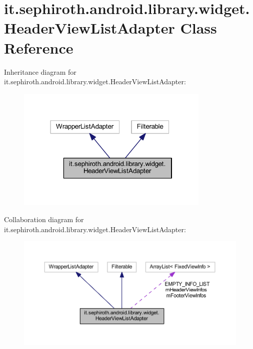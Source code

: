 \hypertarget{classit_1_1sephiroth_1_1android_1_1library_1_1widget_1_1_header_view_list_adapter}{}\section{it.\+sephiroth.\+android.\+library.\+widget.\+Header\+View\+List\+Adapter Class Reference}
\label{classit_1_1sephiroth_1_1android_1_1library_1_1widget_1_1_header_view_list_adapter}


Inheritance diagram for it.\+sephiroth.\+android.\+library.\+widget.\+Header\+View\+List\+Adapter\+:
\nopagebreak
\begin{figure}[H]
\begin{center}
\leavevmode
\includegraphics[width=262pt]{classit_1_1sephiroth_1_1android_1_1library_1_1widget_1_1_header_view_list_adapter__inherit__graph}
\end{center}
\end{figure}


Collaboration diagram for it.\+sephiroth.\+android.\+library.\+widget.\+Header\+View\+List\+Adapter\+:
\nopagebreak
\begin{figure}[H]
\begin{center}
\leavevmode
\includegraphics[width=350pt]{classit_1_1sephiroth_1_1android_1_1library_1_1widget_1_1_header_view_list_adapter__coll__graph}
\end{center}
\end{figure}
